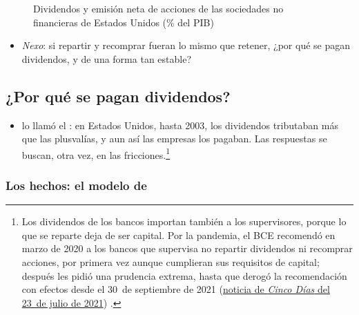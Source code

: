 \documentclass[11pt]{article}
\begin{document}
\begin{figure}[H]
\centering
\caption{Dividendos y emisión neta de acciones de las sociedades no financieras de Estados Unidos (\% del PIB)}\label{fig:dividendos-recompras-eeuu}
\end{figure}

\begin{itemize}
\item \emph{Nexo}: si repartir y recomprar fueran lo mismo que retener, ¿por qué se pagan dividendos, y de una forma tan estable?
\end{itemize}

\subsection{¿Por qué se pagan dividendos?}\label{sec:por-que}

\begin{itemize}
\item \textcite{Black1976Dividend} lo llamó el : en Estados Unidos, hasta 2003, los dividendos tributaban más que las plusvalías\nocite{IRS2026Topic404}, y aun así las empresas los pagaban. Las respuestas se buscan, otra vez, en las fricciones.\footnote{Los dividendos de los bancos importan también a los supervisores, porque lo que se reparte deja de ser capital. Por la pandemia, el BCE recomendó en marzo de 2020 a los bancos que supervisa no repartir dividendos ni recomprar acciones, por primera vez aunque cumplieran sus requisitos de capital\nocite{BCE2020Dividendos}; después les pidió una prudencia extrema\nocite{BCE2020Dividendos62}, hasta que derogó la recomendación con efectos desde el 30~de septiembre de 2021\nocite{BCE2021Dividendos} (\href{https://cincodias.elpais.com/cincodias/2021/07/23/companias/1627053588_202012.html}{noticia de \emph{Cinco Días} del 23~de julio de 2021}) .}
\end{itemize}

\subsubsection{Los hechos: el modelo de }\label{sec:lintner}
\end{document}
